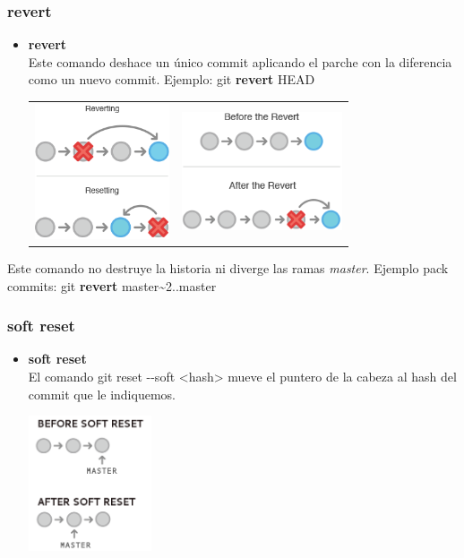 \frame
{
\frametitle{revert}
\begin{itemize}
 \item \textbf{revert}\\ \indent
  Este comando deshace un único commit aplicando el parche con la diferencia como un nuevo commit. Ejemplo: git \textbf{revert} HEAD
 \begin{tabular}{p{4cm}|p{4cm}}\\
    \includegraphics[height=4cm]{imgs/revert-vs-reset.png}&
    \includegraphics[height=3.5cm]{imgs/revert-sample.png}\\
 \end{tabular}
\end{itemize}

 Este comando no destruye la historia ni diverge las ramas \textit{master}. Ejemplo pack commits: git \textbf{revert} master\textasciitilde2..master
}

\frame
{
\frametitle{soft reset}
\begin{itemize}
 \item \textbf{soft reset}\\ \indent
 El comando git reset -{}-soft <hash> mueve el puntero de la cabeza al hash del commit que le indiquemos.\\
 \begin{center}
    \includegraphics[height=4cm]{imgs/soft-reset.png}
 \end{center}
\end{itemize}
}


